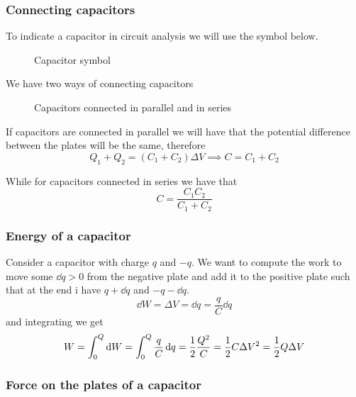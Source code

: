 \documentclass[12pt]{extarticle}
\begin{document}
\subsubsection{Connecting capacitors}

To indicate a capacitor in circuit analysis we will use the symbol below.

\begin{figure}[H]
    \centering
    
    \caption{Capacitor symbol}
\end{figure}

We have two ways of connecting capacitors
\begin{figure}[H]
    \centering
    
    \caption{Capacitors connected in parallel and in series}
\end{figure}

If capacitors are connected in parallel we will have that the potential difference between the plates will be the same, therefore
\begin{equation}
    Q_1 + Q_2 = (C_1 + C_2) \Delta V \implies C = C_1 + C_2
\end{equation}

While for capacitors connected in series we have that
\begin{equation}
    C = \frac{C_1 C_2}{C_1 + C_2}
\end{equation}

\subsubsection{Energy of a capacitor}

Consider a capacitor with charge $q$ and $-q$.
We want to compute the work to move some $\dd{q} > 0$ from the negative plate and add it to the positive plate such that at the end i have $q + \dd{q}$ and $-q - \dd{q}$.
\begin{equation}
    \dd{W} = \Delta V = \dd{q} = \frac{q}{C} \dd{q}
\end{equation}
and integrating we get
\begin{equation}
    W = \int_0^Q \dd{W} = \int^Q_0 \frac{q}{C} \dd{q} = \frac{1}{2} \frac{Q^2}{C}= \frac{1}{2} C \Delta V^2 = \frac{1}{2} Q \Delta V
\end{equation}

\subsubsection{Force on the plates of a capacitor}
\end{document}
